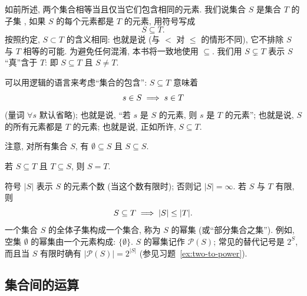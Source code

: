 如前所述, 两个集合相等当且仅当它们包含相同的元素. 我们说集合 $S$ 是集合 $T$ 的子集%
, 如果 $S$ 的每个元素都是 $T$ 的元素, 用符号写成
\[
	S \subseteq T.
\]
按照约定, $S \subset T$ 的含义相同: 也就是说 (与 $<$ 对 $\leq$ 的情形不同), 它不排除 $S$ 与 $T$ 相等的可能. 为避免任何混淆, 本书将一致地使用 $\subseteq$. 我们用 $S \subsetneq T$ 表示 $S$``真''含于 $T$: 即 $S \subseteq T$ 且 $S \neq T$.

可以用逻辑的语言来考虑``集合的包含'': $S \subseteq T$ 意味着
\[
\index{Lie@Lie!Sophus@Sophus}	s \in S \implies s \in T
\]
(量词 $\forall s$ 默认省略); 也就是说, ``若 $s$ 是 $S$ 的元素, 则 $s$ 是 $T$ 的元素''; 也就是说, $S$ 的所有元素都是 $T$ 的元素; 也就是说, 正如所许, $S \subseteq T$.

注意, 对所有集合 $S$, 有 $\emptyset \subseteq S$ 且 $S \subseteq S$.

若 $S \subseteq T$ 且 $T \subseteq S$, 则 $S = T$.

符号 $|S|$ 表示 $S$ 的元素个数 (当这个数有限时); 否则记 $|S| = \infty$. 若 $S$ 与 $T$ 有限, 则
\[
\index{Lie@Lie!Sophus@Sophus!daishu@代数(algebra)}	S \subseteq T \implies |S| \leq |T|.
\]
一个集合 $S$ 的全体子集构成一个集合, 称为 $S$ 的幂集%
(或``部分集合之集''). 例如, 空集 $\emptyset$ 的幂集由一个元素构成: $\{\emptyset\}$. $S$ 的幂集记作 $\mathcal{P}(S)$; 常见的替代记号是 $2^S$, 而且当 $S$ 有限时确有 $|\mathcal{P}(S)| = 2^{|S|}$ (参见习题~\ref{ex:two-to-power}).

\subsection{集合间的运算}
\label{subsec:operations}

